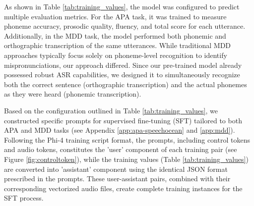 \documentclass[sigconf,nonacm]{acmart}
\begin{document}
As shown in Table \ref{tab:training_values}, the model was configured to predict multiple evaluation metrics. For the APA task, it was trained to measure phoneme accuracy, prosodic quality, fluency, and total score for each utterance. Additionally, in the MDD task, the model performed both phonemic and orthographic transcription of the same utterances. While traditional MDD approaches typically focus solely on phoneme-level recognition to identify mispronunciations, our approach differed. Since our pre-trained model already possessed robust ASR capabilities, we designed it to simultaneously recognize both the correct sentence (orthographic transcription) and the actual phonemes as they were heard (phonemic transcription). 

Based on the configuration outlined in Table \ref{tab:training_values}, we constructed specific prompts for supervised fine-tuning (SFT) tailored to both APA and MDD tasks (see Appendix \ref{app:apa-speechocean} and \ref{app:mdd}). Following the Phi-4 training script format, the prompts, including control tokens and audio tokens, constitutes the 'user' component of each training pair (see Figure \ref{fig:controltoken}), while the training values (Table \ref{tab:training_values}) are converted into 'assistant' component using the identical JSON format prescribed in the prompts. These user-assistant pairs, combined with their corresponding vectorized audio files, create complete training instances for the SFT process.
\end{document}
